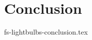 \documentclass[sigconf]{acmart}
\theoremstyle{remark}
\begin{document}
\thispagestyle{empty}






\section {Conclusion}
 {fs-lightbulbs-conclusion.tex}



\end{document}
